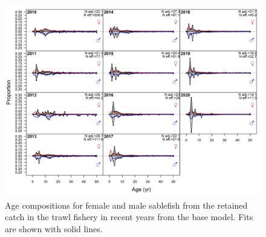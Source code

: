 \documentclass[11pt,
  english,
  a4paper,
]{article}
\begin{document}
\tagmcend\tagstructend


\begin{figure}
\centering
\includegraphics[width=1\textwidth,height=1\textheight]{figs/torc_fleet3_agecomps.png}
\caption{Age compositions for female and male sablefish from the retained catch in the trawl fishery in recent years from the base model. Fits are shown with solid lines. \label{fig:torc_fleet3_agecomps}}
\end{figure}

\tagmcend\tagstructend

\end{document}
